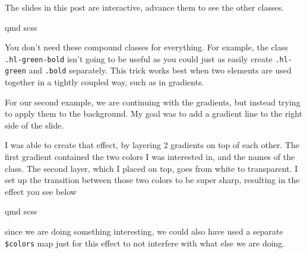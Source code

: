 \documentclass[
  letterpaper,
  DIV=11,
  numbers=noendperiod]{scrreprt}
\begin{document}
\begin{tcolorbox}[enhanced jigsaw, titlerule=0mm, bottomrule=.15mm, opacityback=0, colbacktitle=quarto-callout-important-color!10!white, colframe=quarto-callout-important-color-frame, coltitle=black, breakable, toprule=.15mm, colback=white, bottomtitle=1mm, title=\textcolor{quarto-callout-important-color}{\faExclamation}\hspace{0.5em}{Important}, toptitle=1mm, arc=.35mm, left=2mm, leftrule=.75mm, rightrule=.15mm, opacitybacktitle=0.6]

The slides in this post are interactive, advance them to see the other
classes.

\end{tcolorbox}

qmd scss

\begin{tcolorbox}[enhanced jigsaw, titlerule=0mm, bottomrule=.15mm, opacityback=0, colbacktitle=quarto-callout-note-color!10!white, colframe=quarto-callout-note-color-frame, coltitle=black, breakable, toprule=.15mm, colback=white, bottomtitle=1mm, title=\textcolor{quarto-callout-note-color}{\faInfo}\hspace{0.5em}{Note}, toptitle=1mm, arc=.35mm, left=2mm, leftrule=.75mm, rightrule=.15mm, opacitybacktitle=0.6]

You don't need these compound classes for everything. For example, the
class \texttt{.hl-green-bold} isn't going to be useful as you could just
as easily create \texttt{.hl-green} and \texttt{.bold} separately. This
trick works best when two elements are used together in a tightly
coupled way, such as in gradients.

\end{tcolorbox}

For our second example, we are continuing with the gradients, but
instead trying to apply them to the background. My goal was to add a
gradient line to the right side of the slide.

I was able to create that effect, by layering 2 gradients on top of each
other. The first gradient contained the two colors I was interested in,
and the names of the class. The second layer, which I placed on top,
goes from white to transparent. I set up the transition between those
two colors to be super sharp, resulting in the effect you see below

qmd scss

since we are doing something interesting, we could also have used a
separate \texttt{\$colors} map just for this effect to not interfere
with what else we are doing.
\end{document}
